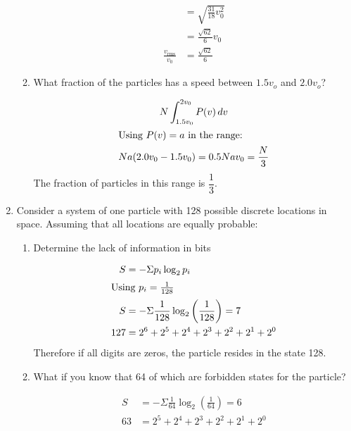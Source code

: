 \documentclass{zc-ust-hw}
\begin{document}
\begin{enumerate}
\begin{enumerate}
\begin{sol}
\begin{align}
             &= \sqrt{\frac{31}{18}v_{0}^2}  \\
             &= \frac{\sqrt{62} }{6}v_{0} \\
             \frac{v_\text{rms}}{v_{0}} &= \frac{\sqrt{62} }{6}
          \end{align}
        \end{sol}
      \item What fraction of the particles has a speed between $1.5v_o$ and $2.0v_o$?
        \begin{sol}
          \begin{gather}
            N\int_{1.5v_{0}}^{2v_{0}} P(v)\,dv \\
            \intertext{Using \( P(v)=a \) in the range:}
            Na(2.0v_{0}-1.5v_{0}) = 0.5Nav_{0} = \frac{N}{3}
          \end{gather}
          The fraction of particles in this range is \( \dfrac{1}{3} \).
        \end{sol}
    \end{enumerate}
    
  \item Consider a system of one particle with 128 possible discrete locations
    in space. Assuming that all locations are equally probable:
    \begin{enumerate}
      \item Determine the lack of information in bits
        \begin{sol}
          \begin{align}
            S &= -\Sigma p_i \log_2 p_i \\
            \intertext{Using \( p_i = \frac{1}{128} \)}
            S&=-\Sigma \frac{1}{128}\log_{2}\left( \frac{1}{128} \right) = 7 \\
            127&=2^{6}+2^{5}+2^{4}+2^{3}+2^{2}+2^{1}+2^{0}
          \end{align}
          Therefore if all digits are zeros, the particle resides in the state 128.
        \end{sol}
      \item What if you know that 64 of which are forbidden states for the particle?
        \begin{sol}
          \begin{align}
            S&=-\Sigma \frac{1}{64}\log_{2}\left( \frac{1}{64} \right) = 6 \\
            63&=2^{5}+2^{4}+2^{3}+2^{2}+2^{1}+2^{0}
          \end{align}
        \end{sol}
    \end{enumerate}
    

\end{enumerate}
\end{document}
